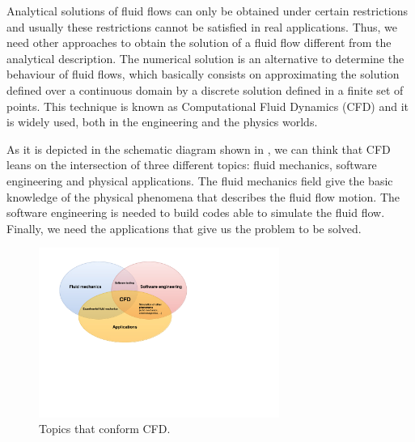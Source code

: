 Analytical solutions of fluid flows can only be obtained under certain restrictions and usually these restrictions cannot be satisfied in real applications. Thus, we need other approaches to obtain the solution of a fluid flow different from the analytical description. The numerical solution is an alternative to determine the behaviour of fluid flows, which basically consists on approximating the solution defined over a continuous domain by a discrete solution defined in a finite set of points. This technique is known as Computational Fluid Dynamics (CFD) and it is widely used, both in the engineering and the physics worlds.

As it is depicted in the schematic diagram shown in , we can think that CFD leans on the intersection of three different topics: fluid mechanics, software engineering and physical applications. The fluid mechanics field give the basic knowledge of the physical phenomena that describes the fluid flow motion. The software engineering is needed to build codes able to simulate the fluid flow. Finally, we need the applications that give us the problem to be solved.

\begin{figure}[h!]
	\centering	
	\includegraphics[trim=2cm 9cm 11cm 1cm,clip=true,width=0.7\textwidth]{Figures/Chapter1/CFD_scheme}
	\caption{Topics that conform CFD.}
	\label{fig-CFD}
\end{figure}

